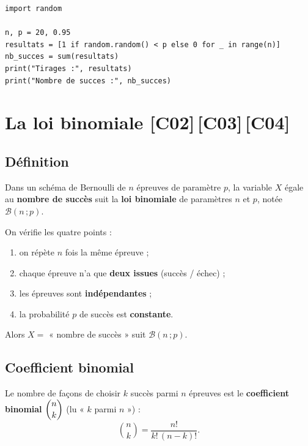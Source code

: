\documentclass[a4paper,11pt]{article}
\begin{document}
\begin{lstlisting}[style=uimmpython, caption={Simulation d'un schéma de Bernoulli (n = 20, p = 0.95)}]
import random

n, p = 20, 0.95
resultats = [1 if random.random() < p else 0 for _ in range(n)]
nb_succes = sum(resultats)
print("Tirages :", resultats)
print("Nombre de succes :", nb_succes)
\end{lstlisting}

\newpage
\section{La loi binomiale \hfill {\normalsize\color{uimmred}[C02]\,[C03]\,[C04]}}

\subsection{Définition}

\begin{definition}
Dans un schéma de Bernoulli de $n$ épreuves de paramètre $p$, la variable $X$ égale au \textbf{nombre de succès} suit la \textbf{loi binomiale} de paramètres $n$ et $p$, notée $\mathcal{B}(n\,;p)$.
\end{definition}

\begin{methode}
On vérifie les quatre points :
\begin{enumerate}
  \item on répète $n$ fois la même épreuve ;
  \item chaque épreuve n'a que \textbf{deux issues} (succès / échec) ;
  \item les épreuves sont \textbf{indépendantes} ;
  \item la probabilité $p$ de succès est \textbf{constante}.
\end{enumerate}
Alors $X = $ « nombre de succès » suit $\mathcal{B}(n\,;p)$.
\end{methode}

\subsection{Coefficient binomial}

\begin{definition}
Le nombre de façons de choisir $k$ succès parmi $n$ épreuves est le \textbf{coefficient binomial} $\dbinom{n}{k}$ (lu « $k$ parmi $n$ ») :
\[
\binom{n}{k} = \frac{n!}{k!\,(n-k)!}.
\]
\end{definition}
\end{document}
